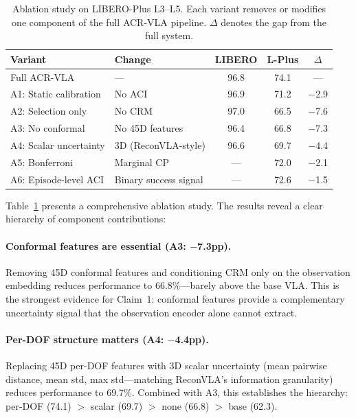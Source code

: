 \documentclass[10pt,letterpaper]{article}
\newcommand{\ours}{ACR-VLA}
\newcommand{\crm}{CRM}
\begin{document}
\begin{table}[t]
\centering
\caption{Ablation study on LIBERO-Plus L3--L5. Each variant removes or modifies one component of the full \ours{} pipeline. $\Delta$ denotes the gap from the full system.}
\label{tab:ablation}
\begin{tabular}{llccc}
\toprule
\textbf{Variant} & \textbf{Change} & \textbf{LIBERO} & \textbf{L-Plus} & \textbf{$\Delta$} \\
\midrule
Full \ours{} & --- & 96.8 & 74.1 & --- \\
\midrule
A1: Static calibration & No ACI & 96.9 & 71.2 & $-$2.9 \\
A2: Selection only & No CRM & 97.0 & 66.5 & $-$7.6 \\
A3: No conformal & No 45D features & 96.4 & 66.8 & $-$7.3 \\
A4: Scalar uncertainty & 3D (ReconVLA-style) & 96.6 & 69.7 & $-$4.4 \\
A5: Bonferroni & Marginal CP & --- & 72.0 & $-$2.1 \\
A6: Episode-level ACI & Binary success signal & --- & 72.6 & $-$1.5 \\
\bottomrule
\end{tabular}
\end{table}

Table~\ref{tab:ablation} presents a comprehensive ablation study.
The results reveal a clear hierarchy of component contributions:

\paragraph{Conformal features are essential (A3: $-$7.3pp).}
Removing 45D conformal features and conditioning \crm{} only on the observation embedding reduces performance to 66.8\%---barely above the base VLA.
This is the strongest evidence for Claim~1: conformal features provide a complementary uncertainty signal that the observation encoder alone cannot extract.

\paragraph{Per-DOF structure matters (A4: $-$4.4pp).}
Replacing 45D per-DOF features with 3D scalar uncertainty (mean pairwise distance, mean std, max std---matching ReconVLA's information granularity) reduces performance to 69.7\%.
Combined with A3, this establishes the hierarchy: per-DOF (74.1) $>$ scalar (69.7) $>$ none (66.8) $>$ base (62.3).
\end{document}
